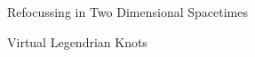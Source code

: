\documentclass[copyright, final]{dcthesis}
\numberwithin{equation}{section}
\theoremstyle{plain}
\theoremstyle{definition}
\theoremstyle{definition}
\theoremstyle{remark}
\begin{document}
\tableofcontents

\listoftables



\mainmatter

\begin{chapter}{Refocussing in Two Dimensional Spacetimes}\label{ch refocussing}

\end{chapter}

\begin{chapter}{Virtual Legendrian Knots}\label{ch vlk}

\end{chapter}
%

\backmatter


\cleardoublepage

\cleardoublepage

\nocite{BGRL2001}

{}


\end{document}
